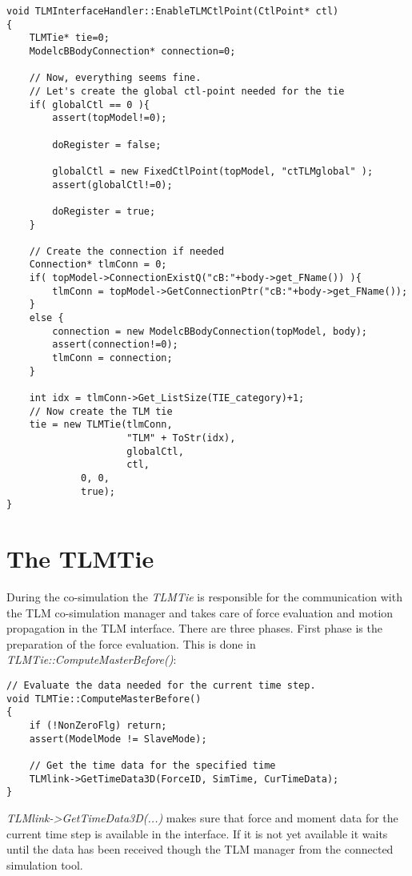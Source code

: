 {\scriptsize
\begin{verbatim}
void TLMInterfaceHandler::EnableTLMCtlPoint(CtlPoint* ctl)
{
    TLMTie* tie=0;
    ModelcBBodyConnection* connection=0;

    // Now, everything seems fine.
    // Let's create the global ctl-point needed for the tie
    if( globalCtl == 0 ){
        assert(topModel!=0);

        doRegister = false;

        globalCtl = new FixedCtlPoint(topModel, "ctTLMglobal" );
        assert(globalCtl!=0);

        doRegister = true;
    }

    // Create the connection if needed
    Connection* tlmConn = 0;
    if( topModel->ConnectionExistQ("cB:"+body->get_FName()) ){
        tlmConn = topModel->GetConnectionPtr("cB:"+body->get_FName());
    }
    else {
        connection = new ModelcBBodyConnection(topModel, body);
        assert(connection!=0);
        tlmConn = connection;
    }

    int idx = tlmConn->Get_ListSize(TIE_category)+1;
    // Now create the TLM tie
    tie = new TLMTie(tlmConn,
                     "TLM" + ToStr(idx),
                     globalCtl,
                     ctl,
		     0, 0,
		     true);
}
\end{verbatim}
}

\section{The TLMTie}

During the co-simulation the {\em TLMTie} is responsible for the communication with the TLM co-simulation manager and takes care of force evaluation and motion propagation in the TLM interface. 
There are three phases. 
First phase is the preparation of the force evaluation. 
This is done in {\em TLMTie::ComputeMasterBefore()}:

{\scriptsize
\begin{verbatim}
// Evaluate the data needed for the current time step.
void TLMTie::ComputeMasterBefore()
{
    if (!NonZeroFlg) return;
    assert(ModelMode != SlaveMode);

    // Get the time data for the specified time
    TLMlink->GetTimeData3D(ForceID, SimTime, CurTimeData);
}
\end{verbatim}
}

{\em TLMlink->GetTimeData3D(...)} makes sure that force and moment data for the current time step is available in the interface. 
If it is not yet available it waits until the data has been received though the TLM manager from the connected simulation tool.

